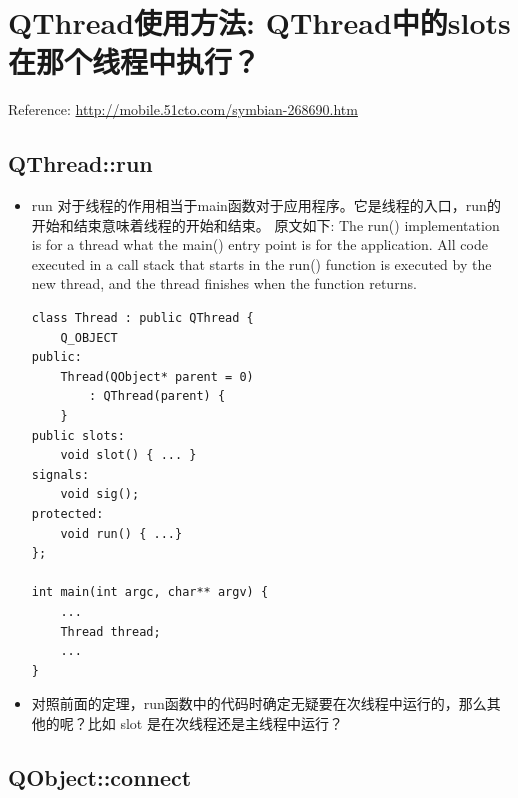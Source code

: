 \documentclass[9pt,b5paper]{article}
\begin{document}
\section{QThread使用方法: QThread中的slots在那个线程中执行？}
\label{sec-3}
Reference: \url{http://mobile.51cto.com/symbian-268690.htm}
\subsection{QThread::run}
\label{sec-3-1}
\begin{itemize}
\item run 对于线程的作用相当于main函数对于应用程序。它是线程的入口，run的开始和结束意味着线程的开始和结束。 原文如下: The run() implementation is for a thread what the main() entry point is for the application. All code executed in a call stack that starts in the run() function is executed by the new thread, and the thread finishes when the function returns.  
\lstset{language=java,label= ,caption= ,numbers=none}
\begin{lstlisting}
class Thread : public QThread {       
    Q_OBJECT
public:       
    Thread(QObject* parent = 0)
        : QThread(parent) {
    }
public slots:       
    void slot() { ... }
signals:       
    void sig();
protected:       
    void run() { ...}
};    

int main(int argc, char** argv) {
    ...
    Thread thread;
    ...
}
\end{lstlisting}
\item 对照前面的定理，run函数中的代码时确定无疑要在次线程中运行的，那么其他的呢？比如 slot 是在次线程还是主线程中运行？
\end{itemize}
\subsection{QObject::connect}
\label{sec-3-2}
\end{document}
